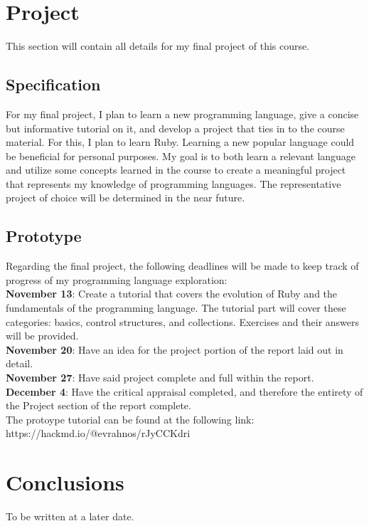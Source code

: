 \documentclass{article}
\theoremstyle{theorem}
\theoremstyle{definition}
\theoremstyle{remark}
\begin{document}
\section{Project}
This section will contain all details for my final project of this course.
\subsection{Specification}
For my final project, I plan to learn a new programming language, give a concise but informative tutorial on it, and develop a project that ties in to the course material. For this, I plan to learn Ruby. Learning a new popular language could be beneficial for personal purposes. My goal is to both learn a relevant language and utilize some concepts learned in the course to create a meaningful project that represents my knowledge of programming languages. The representative project of choice will be determined in the near future.
\subsection{Prototype}
Regarding the final project, the following deadlines will be made to keep track of progress of my programming language exploration:\\

\noindent \textbf{November 13}: Create a tutorial that covers the evolution of Ruby and the fundamentals of the programming language. The tutorial part will cover these categories: basics, control structures, and collections. Exercises and their answers will be provided.\\

\noindent \textbf{November 20}: Have an idea for the project portion of the report laid out in detail.\\

\noindent \textbf{November 27}: Have said project complete and full within the report.\\

\noindent \textbf{December 4}: Have the critical appraisal completed, and therefore the entirety of the Project section of the report complete. \\

\noindent The protoype tutorial can be found at the following link: https://hackmd.io/@evrahnos/rJyCCKdri

\section{Conclusions}\label{conclusions}

To be written at a later date.
\end{document}
